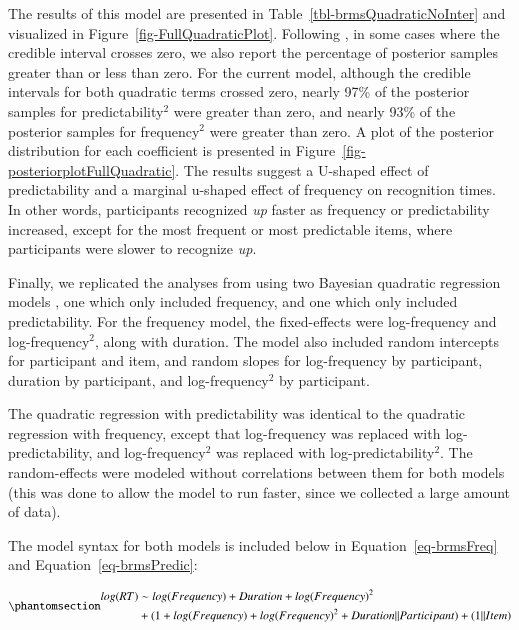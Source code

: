 \documentclass[
  authoryear,
  preprint,
  1p,
  onecolumn]{elsarticle}
\begin{document}
The results of this model are presented in
Table~\ref{tbl-brmsQuadraticNoInter} and visualized in
Figure~\ref{fig-FullQuadraticPlot}. Following
\citet{houghtonTaskdependentConsequencesDisfluency2023}, in some cases
where the credible interval crosses zero, we also report the percentage
of posterior samples greater than or less than zero. For the current
model, although the credible intervals for both quadratic terms crossed
zero, nearly 97\% of the posterior samples for predictability\(^2\) were
greater than zero, and nearly 93\% of the posterior samples for
frequency\(^2\) were greater than zero. A plot of the posterior
distribution for each coefficient is presented in
Figure~\ref{fig-posteriorplotFullQuadratic}. The results suggest a
U-shaped effect of predictability and a marginal u-shaped effect of
frequency on recognition times. In other words, participants recognized
\emph{up} faster as frequency or predictability increased, except for
the most frequent or most predictable items, where participants were
slower to recognize \emph{up}.

Finally, we replicated the analyses from \citet{kapatsinski2009} using
two Bayesian quadratic regression models \citep[implemented in
\emph{brms;}][]{brms}, one which only included frequency, and one which
only included predictability. For the frequency model, the fixed-effects
were log-frequency and log-frequency\(^2\), along with duration. The
model also included random intercepts for participant and item, and
random slopes for log-frequency by participant, duration by participant,
and log-frequency\(^2\) by participant.

The quadratic regression with predictability was identical to the
quadratic regression with frequency, except that log-frequency was
replaced with log-predictability, and log-frequency\(^2\) was replaced
with log-predictability\(^2\). The random-effects were modeled without
correlations between them for both models (this was done to allow the
model to run faster, since we collected a large amount of data).

The model syntax for both models is included below in
Equation~\ref{eq-brmsFreq} and Equation~\ref{eq-brmsPredic}:

\begin{equation}\phantomsection\label{eq-brmsFreq}{
\begin{aligned}
log(RT) & \sim log(Frequency) + Duration + log(Frequency)^2 \\ & + (1 + log(Frequency) + log(Frequency)^2 + Duration || Participant) + (1 || Item)
\end{aligned}
}\end{equation}
\end{document}
